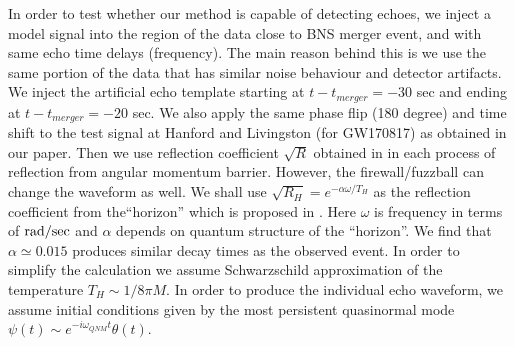 \documentclass[a4paper,11pt]{article}
\begin{document}
In order to test whether our method is capable of detecting echoes, we inject a model signal into the region of the data close to BNS merger event, and with same echo time delays (frequency). The main reason behind this is we use the same portion of the data that has similar noise behaviour and detector artifacts. 
 We inject the artificial echo template starting at $t-t_{merger}=-30$ sec and ending at $t-t_{merger}=-20$ sec. We also apply the same phase flip (180 degree) and time shift to the test signal at Hanford and Livingston (for GW170817) as obtained in our paper. Then we use reflection coefficient $\sqrt{R}$ obtained in  \cite{Nakano:2017fvh} in each process of reflection from angular momentum barrier. However, the firewall/fuzzball can change the waveform as well. We shall use $\sqrt{R_{H}} =e^{-\alpha \omega/T_{H}}$  as the reflection coefficient from the``horizon'' which is proposed in \cite{Oshita:2018fqu}. Here $\omega$ is frequency in terms of $\rm{rad}/\rm{sec}$ and $\alpha$ depends on quantum structure of the ``horizon''. We find that $\alpha \simeq 0.015$ produces similar decay times as the observed event. In order to simplify the calculation we assume Schwarzschild approximation of the temperature $T_{H} \sim 1/8\pi M$.  In order to produce the individual echo waveform, we assume initial conditions given by the most persistent quasinormal mode  $\psi(t) \sim e^{-i\omega_{QNM}t} \theta(t)$. 
  
\end{document}
